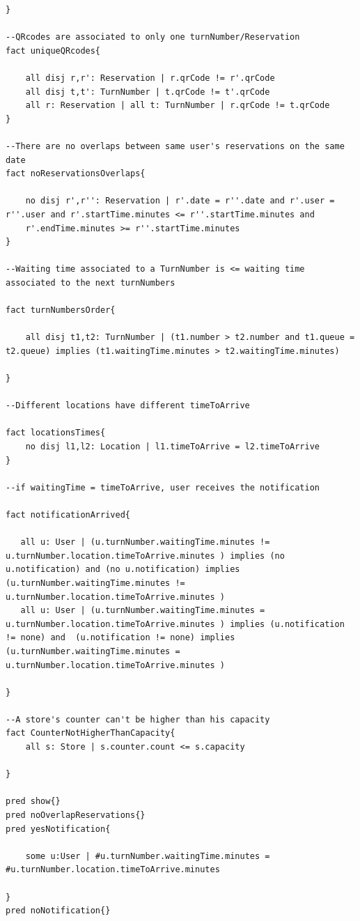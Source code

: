 \documentclass{article}
\begin{document}
\begin{lstlisting}[language=alloy]
}

--QRcodes are associated to only one turnNumber/Reservation
fact uniqueQRcodes{

    all disj r,r': Reservation | r.qrCode != r'.qrCode
    all disj t,t': TurnNumber | t.qrCode != t'.qrCode
    all r: Reservation | all t: TurnNumber | r.qrCode != t.qrCode
}

--There are no overlaps between same user's reservations on the same date
fact noReservationsOverlaps{

	no disj r',r'': Reservation | r'.date = r''.date and r'.user = r''.user and r'.startTime.minutes <= r''.startTime.minutes and
    r'.endTime.minutes >= r''.startTime.minutes
}

--Waiting time associated to a TurnNumber is <= waiting time associated to the next turnNumbers

fact turnNumbersOrder{
	
	all disj t1,t2: TurnNumber | (t1.number > t2.number and t1.queue = t2.queue) implies (t1.waitingTime.minutes > t2.waitingTime.minutes)

}

--Different locations have different timeToArrive

fact locationsTimes{
	no disj l1,l2: Location | l1.timeToArrive = l2.timeToArrive
}

--if waitingTime = timeToArrive, user receives the notification

fact notificationArrived{

   all u: User | (u.turnNumber.waitingTime.minutes != u.turnNumber.location.timeToArrive.minutes ) implies (no u.notification) and (no u.notification) implies (u.turnNumber.waitingTime.minutes != u.turnNumber.location.timeToArrive.minutes ) 
   all u: User | (u.turnNumber.waitingTime.minutes = u.turnNumber.location.timeToArrive.minutes ) implies (u.notification != none) and 	(u.notification != none) implies (u.turnNumber.waitingTime.minutes = u.turnNumber.location.timeToArrive.minutes )
       
}

--A store's counter can't be higher than his capacity
fact CounterNotHigherThanCapacity{
	all s: Store | s.counter.count <= s.capacity

}

pred show{}
pred noOverlapReservations{}
pred yesNotification{
	
	some u:User | #u.turnNumber.waitingTime.minutes = #u.turnNumber.location.timeToArrive.minutes

}
pred noNotification{}


\end{lstlisting}
\end{document}
